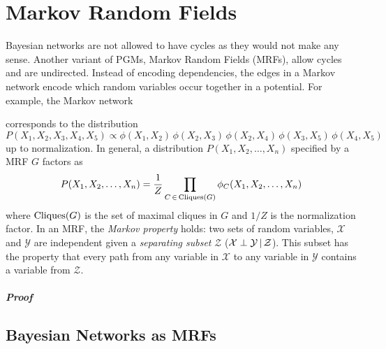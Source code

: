 \chapter{Markov Random Fields}
	Bayesian networks are not allowed to have cycles as they would not make any sense. Another variant of PGMs, Markov Random Fields (MRFs), allow cycles and are undirected. Instead of encoding dependencies, the edges in a Markov network encode which random variables occur together in a potential. For example, the Markov network
	\begin{center}
	\end{center}
	corresponds to the distribution
	\begin{equation}
		P(X_1, X_2, X_3, X_4, X_5) \propto \phi(X_1, X_2) \, \phi(X_2, X_3) \, \phi(X_2, X_4) \, \phi(X_3, X_5) \, \phi(X_4, X_5)
	\end{equation}
	up to normalization. In general, a distribution \( P(X_1, X_2, \dots, X_n) \) specified by a MRF \(G\) factors as
	\begin{equation}
		P(X_1, X_2, \dots, X_n) = \frac{1}{Z} \prod_{C \,\in\, \operatorname{Cliques}(G)} \phi_C(X_1, X_2, \dots, X_n)
	\end{equation}
	where \( \operatorname{Cliques}(G) \) is the set of maximal cliques in \(G\) and \(1/Z\) is the normalization factor. In an MRF, the \emph{Markov property} holds: two sets of random variables, \(\mathcal{X}\) and \(\mathcal{Y}\) are independent given a \emph{separating subset} \(\mathcal{Z}\) (\( \mathcal{X} \perp \mathcal{Y} \,\vert\, \mathcal{Z} \)). This subset has the property that every path from any variable in \(\mathcal{X}\) to any variable in \(\mathcal{Y}\) contains a variable from \(\mathcal{Z}\).

	\paragraph{Proof}

	\section{Bayesian Networks as MRFs}
		\label{sec:towardsMarkovRandomFields}

